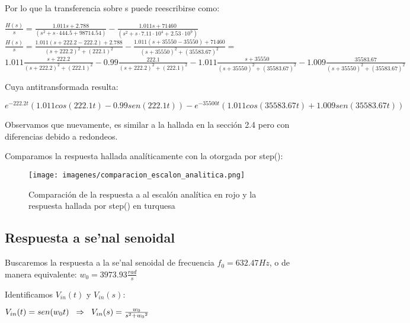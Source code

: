 \documentclass[12pt, titlepage]{article}
\begin{document}
    Por lo que la transferencia sobre s puede reescribirse como:
    
    \begin{center}
               $\frac{H(s)}{s} = \frac{1.011 s + 2.788}{(s^2+ s \cdot 444.5 + 98714.54)} -  \frac{1.011s + 71460}{(s^2 +s \cdot 7.11\cdot 10^{4} + 2.53\cdot10^{9})}$\\
               \vspace{5mm}
               $\frac{H(s)}{s} = \frac{1.011 (s+222.2-222.2) + 2.788}{(s+222.2)^2 + (222.1)^2} -  \frac{1.011(s+35550-35550) + 71460}{(s+35550)^2  + (35583.67)^2} = $\\
               \vspace{5mm}
           $1.011 \frac{s+222.2}{(s+222.2)^2 + (222.1)^2} - 0.99\frac{222.1}{(s+222.2)^2 + (222.1)^2} -  1.011\frac{s+35550}{(s+35550)^2  + (35583.67)^2} - 1.009 \frac{35583.67}{(s+35550)^2  + (35583.67)^2} $
    \end{center}
    
    Cuya antitransformada resulta:
    
      \begin{center}
        \small $e^{-222.2t}(1.011cos(222.1t)-0.99sen(222.1t)) - e^{-35500t}(1.011cos(35583.67t)+1.009sen(35583.67t))$
    \end{center}
    
    Observamos que nuevamente, es similar a la hallada en la sección 2.4 pero con diferencias debido a redondeos.
    
     Comparamos la respuesta hallada analíticamente con la otorgada por step():
    
    \begin{figure}[!htb]
    \texttt{[image: imagenes/comparacion\_escalon\_analitica.png]}
    \centering
    \caption{Comparación de la respuesta a al escalón analítica en rojo y la respuesta hallada por step() en turquesa}
    \end{figure}
    
    \subsection{Respuesta a se'nal senoidal}
    Buscaremos la respuesta a la se'nal senoidal de frecuencia $f_0 = 632.47Hz$, o de manera equivalente: $w_0 = 3973.93\frac{rad}{s}$
    
    Identificamos $V_{in}(t)$ y $V_{in}(s)$:
    \begin{center}
        $V_{in}(t) = sen(w_0t) \hspace{2mm} \Rightarrow  \hspace{2mm} V_{in}(s) = \frac{w_0}{s^2+{w_0}^2}$
    \end{center}
    
\end{document}
